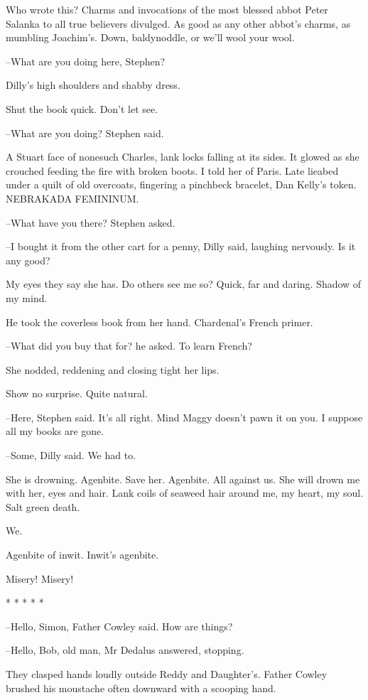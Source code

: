 Who wrote this?
Charms and invocations of the most blessed abbot Peter Salanka
to all true believers divulged.
As good as any other abbot's
charms,
as mumbling Joachim's.
Down, baldynoddle, or we'll wool your
wool.

--What are you doing here, Stephen?

Dilly's high shoulders and shabby dress.

Shut the book quick.
Don't let see.

--What are you doing?
Stephen said.

A Stuart face of nonesuch Charles,
lank locks falling at its sides.
It glowed as she crouched
feeding the fire with broken boots.
I told her of Paris.
Late lieabed under a quilt of old overcoats,
fingering a pinchbeck bracelet,
Dan Kelly's token.
NEBRAKADA FEMININUM.

--What have you there?
Stephen asked.

--I bought it from the other cart for a penny,
Dilly said,
laughing
nervously.
Is it any good?

My eyes they say she has.
Do others see me so?
Quick, far and daring.
Shadow of my mind.

He took the coverless book from her hand.
Chardenal's French primer.

--What did you buy that for?
he asked.
To learn French?

She nodded,
reddening and closing tight her lips.

Show no surprise. Quite natural.

--Here,
Stephen said.
It's all right.
Mind Maggy doesn't pawn it on you.
I suppose all my books are gone.

--Some,
Dilly said.
We had to.

She is drowning.
Agenbite.
Save her.
Agenbite.
All against us.
She will
drown me with her,
eyes and hair.
Lank coils of seaweed hair around me,
my heart, my soul.
Salt green death.

We.

Agenbite of inwit.
Inwit's agenbite.

Misery!
Misery!


    * * * * *


--Hello, Simon,
Father Cowley said.
How are things?

--Hello, Bob, old man,
Mr Dedalus answered,
stopping.

They clasped hands loudly outside Reddy and Daughter's.
Father Cowley
brushed his moustache often downward
with a scooping hand.

